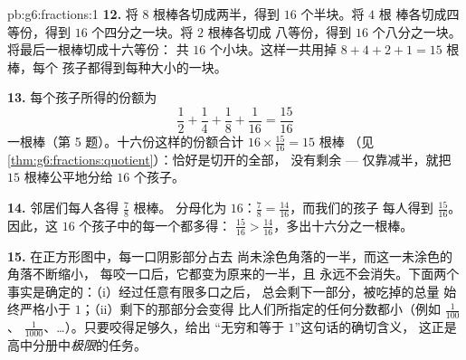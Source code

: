 \begin{solution}{pb:g6:fractions:1}
\textbf{12.} 将 $8$ 根棒各切成两半，得到 $16$ 个半块。将 $4$ 根
棒各切成四等份，得到 $16$ 个四分之一块。将 $2$ 根棒各切成
八等份，得到 $16$ 个八分之一块。将最后一根棒切成十六等份：
共 $16$ 个小块。这样一共用掉 $8 + 4 + 2 + 1 = 15$ 根棒，每个
孩子都得到每种大小的一块。

\textbf{13.} 每个孩子所得的份额为
\[
\frac12 + \frac14 + \frac18 + \frac{1}{16} = \frac{15}{16}
\]
一根棒（第 5 题）。十六份这样的份额合计
$16 \times \frac{15}{16} = 15$ 根棒
（见\cref{thm:g6:fractions:quotient}）：恰好是切开的全部，
没有剩余 --- 仅靠减半，就把 $15$ 根棒公平地分给 $16$
个孩子。

\textbf{14.} 邻居们每人各得 $\frac78$ 根棒。
分母化为 $16$：$\frac78 = \frac{14}{16}$，而我们的孩子
每人得到 $\frac{15}{16}$。因此，这 $16$ 个孩子中的每一个都多得：
$\frac{15}{16} > \frac{14}{16}$，多出十六分之一根棒。

\textbf{15.} 在正方形图中，每一口阴影部分占去
尚未涂色角落的一半，而这一未涂色的角落不断缩小，
每咬一口后，它都变为原来的一半，且
永远不会消失。下面两个事实是确定的：（i）经过任意有限多口之后，
总会剩下一部分，被吃掉的总量
始终严格小于 $1$；（ii）剩下的那部分会变得
比人们所指定的任何分数都小（例如 $\frac{1}{100}$、
$\frac{1}{1000}$、\dots）。只要咬得足够久，给出
“无穷和等于 $1$”这句话的确切含义，
这正是高中分册中\emph{极限}的任务。
\end{solution}
